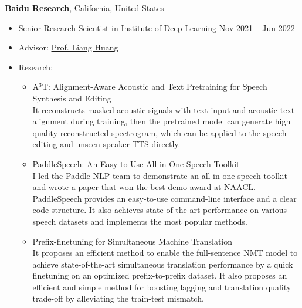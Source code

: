 {\bf \href{http://research.baidu.com/}{Baidu Research}}, California, United States
\begin{itemize}
    \item[] Senior Research Scientist in Institute of Deep Learning \hfill Nov 2021 -- Jun 2022
    \item[] Advisor: \href{https://web.engr.oregonstate.edu/~huanlian/}{Prof. Liang Huang}
    \item[] Research:
    \begin{itemize}
        \item A$^3$T: Alignment-Aware Acoustic and Text Pretraining for Speech Synthesis and Editing~\cite{tmp-a3t} \\
            It reconstructs masked acoustic signals with text input and acoustic-text alignment during training, then the pretrained model can generate high quality reconstructed spectrogram, which can be applied to the speech editing and unseen speaker TTS directly.
        \item PaddleSpeech: An Easy-to-Use All-in-One Speech Toolkit~\cite{tmp-paddlespeech} \\
            I led the Paddle NLP team to demonstrate an all-in-one speech toolkit and wrote a paper that won \href{https://2022.naacl.org/blog/best-demo-award/}{the best demo award at NAACL}. PaddleSpeech provides an easy-to-use command-line interface and a clear code structure. It also achieves state-of-the-art performance on various speech datasets and implements the most popular methods.
        \item Prefix-finetuning for Simultaneous Machine Translation \\
            It proposes an efficient method to enable the full-sentence NMT model to achieve state-of-the-art simultaneous translation performance by a quick finetuning on an optimized prefix-to-prefix dataset.
            It also proposes an efficient and simple method for boosting lagging and translation quality trade-off by alleviating the train-test mismatch.
    \end{itemize}
\end{itemize}

